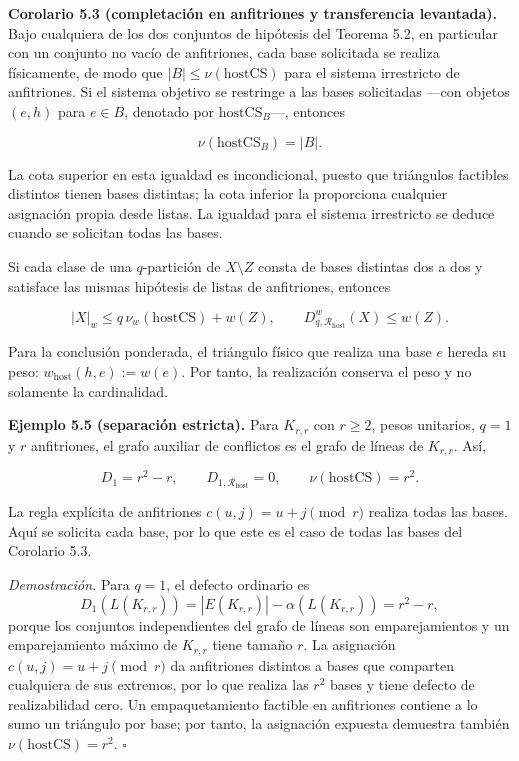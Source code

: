 \documentclass[spanish,11pt,a4paper]{article}
\begin{document}
\textbf{Corolario 5.3 (completación en anfitriones y transferencia
levantada).} Bajo cualquiera de los dos conjuntos de hipótesis del
Teorema 5.2, en particular con un conjunto no vacío de anfitriones, cada
base solicitada se realiza físicamente, de modo que
\(|B|\le\nu(\mathrm{hostCS})\) para el sistema irrestricto de
anfitriones. Si el sistema objetivo se restringe a las bases solicitadas
---con objetos \((e,h)\) para \(e\in B\), denotado por
\(\mathrm{hostCS}_B\)---, entonces

\[
\nu(\mathrm{hostCS}_B)=|B|.
\]

La cota superior en esta igualdad es incondicional, puesto que
triángulos factibles distintos tienen bases distintas; la cota inferior
la proporciona cualquier asignación propia desde listas. La igualdad
para el sistema irrestricto se deduce cuando se solicitan todas las
bases.

Si cada clase de una \(q\)-partición de \(X\setminus Z\) consta de bases
distintas dos a dos y satisface las mismas hipótesis de listas de
anfitriones, entonces

\[
|X|_w\le q\,\nu_w(\mathrm{hostCS})+w(Z),
\qquad
D_{q,\mathcal R_{\mathrm{host}}}^w(X)\le w(Z).
\]

Para la conclusión ponderada, el triángulo físico que realiza una base
\(e\) hereda su peso: \(w_{\mathrm{host}}(h,e):=w(e)\). Por tanto, la
realización conserva el peso y no solamente la cardinalidad.

\textbf{Ejemplo 5.5 (separación estricta).} Para \(K_{r,r}\) con
\(r\ge2\), pesos unitarios, \(q=1\) y \(r\) anfitriones, el grafo
auxiliar de conflictos es el grafo de líneas de \(K_{r,r}\). Así,

\[
D_1=r^2-r,
\qquad
D_{1,\mathcal R_{\mathrm{host}}}=0,
\qquad
\nu(\mathrm{hostCS})=r^2.
\]

La regla explícita de anfitriones \(c(u,j)=u+j\pmod r\) realiza todas
las bases. Aquí se solicita cada base, por lo que este es el caso de
todas las bases del Corolario 5.3.

\emph{Demostración.} Para \(q=1\), el defecto ordinario es \[
D_1(L(K_{r,r}))=|E(K_{r,r})|-\alpha(L(K_{r,r}))=r^2-r,
\] porque los conjuntos independientes del grafo de líneas son
emparejamientos y un emparejamiento máximo de \(K_{r,r}\) tiene tamaño
\(r\). La asignación \(c(u,j)=u+j\pmod r\) da anfitriones distintos a
bases que comparten cualquiera de sus extremos, por lo que realiza las
\(r^2\) bases y tiene defecto de realizabilidad cero. Un empaquetamiento
factible en anfitriones contiene a lo sumo un triángulo por base; por
tanto, la asignación expuesta demuestra también
\(\nu(\mathrm{hostCS})=r^2\). \(\square\)
\end{document}
